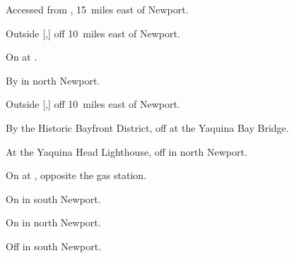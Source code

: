 

\begin{LocationList}

Accessed from , 15~miles east of Newport.

Outside [,] off  10~miles east of Newport.

\Location{\GasStation \Gas}
On  at .

By  in north Newport.

Outside [,] off  10~miles east of Newport.

By the Historic Bayfront District, off  at the Yaquina Bay Bridge.

\Location{\RestArea \Rest}
At the Yaquina Head Lighthouse, off  in north Newport.

On  at , opposite the gas station.

\Location{\TruckService \Service}
On  in south Newport.

On  in north Newport.

Off  in south Newport.

\end{LocationList}
